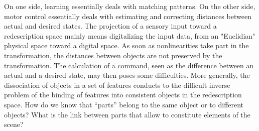 \documentclass[11pt]{article}
\begin{document}
On one side, learning essentially deals with matching patterns. On the other side, motor control essentially deals with estimating and correcting distances between actual and desired states. The projection of a sensory input toward a redescription space mainly means digitalizing the input data, from an "Euclidian" physical space toward a digital space. As soon as nonlinearities take part in the transformation, the distances between objects are not preserved by the transformation. The calculation of a command, seen as  the difference between an actual and a desired state, may then poses some difficulties. 
More generally, the dissociation of objects in a set of features conducts to the difficult inverse problem of the binding of features into consistent objects in the redescription space. How do we know that ``parts'' belong to the same object or to different objects? What is the link between parts that allow to constitute elements of the scene?







\end{document}
